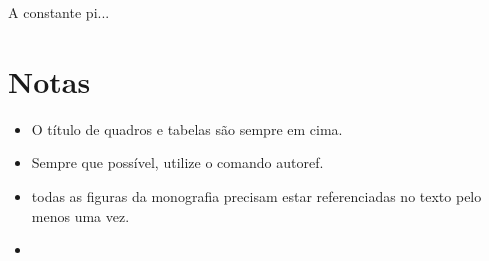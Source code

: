 
A constante \gls{pi}... 
 
\section{Notas}
\begin{itemize}
    \item O título de quadros e tabelas são sempre em cima.
    \item Sempre que possível, utilize o comando autoref.
    \item todas as figuras da monografia precisam estar referenciadas no texto pelo menos uma vez.
    \item 
\end{itemize}